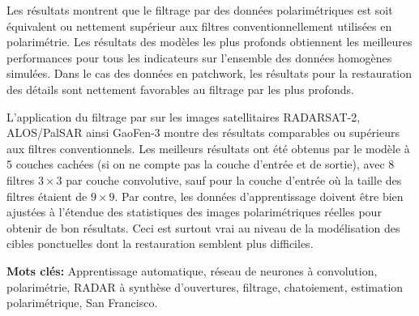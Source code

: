 Les résultats montrent que le filtrage par \acrconvnet des données polarimétriques est soit équivalent ou nettement supérieur aux filtres conventionnellement utilisées en polarimétrie.  Les résultats des modèles les plus profonds obtiennent les meilleures performances pour tous les indicateurs sur l'ensemble des données homogènes simulées.  Dans le cas des données en patchwork, les résultats pour la restauration des détails sont nettement favorables au filtrage par \acrconvnet les plus profonds.

L'application du filtrage par \acrconvnet sur les images satellitaires RADARSAT-2, ALOS/PalSAR ainsi GaoFen-3 montre des résultats comparables ou supérieurs aux filtres conventionnels.  Les meilleurs résultats ont été obtenus par le modèle à 5 couches cachées (si on ne compte pas la couche d'entrée et de sortie), avec 8 filtres $3 \times 3$ par couche convolutive, sauf pour la couche d'entrée où la taille des filtres étaient de $9 \times 9$.  Par contre, les données d'apprentissage doivent être bien ajustées à l'étendue des statistiques des images polarimétriques réelles pour obtenir de bon résultats.  Ceci est surtout vrai au niveau de la modélisation des cibles ponctuelles dont la restauration semblent plus difficiles.
\newline

\textbf{Mots clés:} Apprentissage automatique, réseau de neurones à convolution, polarimétrie, RADAR à synthèse d’ouvertures, filtrage, chatoiement, estimation polarimétrique, San Francisco.


